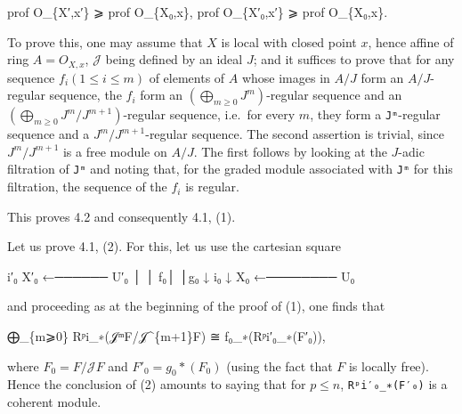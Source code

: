 \documentclass[
  11pt,
  a4paper,
]{book}
\newenvironment{Shaded}{}{}
\newcommand{\NormalTok}[1]{#1}
\begin{document}
\begin{Shaded}
\begin{Highlighting}[]
\NormalTok{prof O\_\{X′,x′\} ⩾ prof O\_\{X₀,x\},  prof O\_\{X′₀,x′\} ⩾ prof O\_\{X₀,x\}.}
\end{Highlighting}
\end{Shaded}

To prove this, one may assume that \(X\) is local with closed point
\(x\), hence affine of ring \(A = O_{X,x}\), \(\mathcal{J}\) being
defined by an ideal \(J\); and it suffices to prove that for any
sequence \(f_{i} (1 \leqslant i \leqslant m)\) of elements of \(A\)
whose images in \(A/J\) form an \(A/J\)-regular sequence, the \(f_{i}\)
form an \((\bigoplus_{m\geqslant 0}
J^{m})\)-regular sequence and an
\((\bigoplus_{m\geqslant 0} J^{m}/J^{m+1})\)-regular sequence, i.e.~for
every \(m\), they form a \texttt{Jᵐ}-regular sequence and a
\(J^{m}/J^{m+1}\)-regular sequence. The second assertion is trivial,
since \(J^{m}/J^{m+1}\) is a free module on \(A/J\). The first follows
by looking at the \(J\)-adic filtration of \texttt{Jᵐ} and noting that,
for the graded module associated with \texttt{Jᵐ} for this filtration,
the sequence of the \(f_{i}\) is regular.

This proves 4.2 and consequently 4.1, (1).

Let us prove 4.1, (2). For this, let us use the cartesian square

\begin{Shaded}
\begin{Highlighting}[]
\NormalTok{        i′₀}
\NormalTok{X′₀ ←────── U′₀}
\NormalTok{│            │}
\NormalTok{f₀│            │g₀}
\NormalTok{↓     i₀     ↓}
\NormalTok{X₀ ←──────── U₀}
\end{Highlighting}
\end{Shaded}

and proceeding as at the beginning of the proof of (1), one finds that

\begin{Shaded}
\begin{Highlighting}[]
\NormalTok{⨁\_\{m⩾0\} Rᵖi\_∗(𝒥ᵐF/𝒥\^{}\{m+1\}F) ≅ f₀\_∗(Rᵖi′₀\_∗(F′₀)),}
\end{Highlighting}
\end{Shaded}

where \(F_{0} = F/\mathcal{J}F\) and \(F'_{0} = g_{0}*(F_{0})\) (using
the fact that \(F\) is locally free). Hence the conclusion of (2)
amounts to saying that for \(p \leqslant n\), \texttt{Rᵖi′₀\_∗(F′₀)} is
a coherent module.
\end{document}
